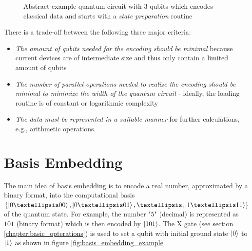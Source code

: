\begin{figure}[!h]
    \centering
    \caption{Abstract example quantum circuit with 3 qubits which encodes classical data and starts with a \textit{state preparation} routine}
    \label{fig:circuit_state_preparation}
\end{figure}

There is a trade-off between the following three major criteria\cite{Weigold2021_ExpandingDataEncodingPatterns}:
\begin{itemize}
    \item \textit{The amount of qubits needed for the encoding should be minimal} because current devices are of intermediate size and thus only contain a limited amount of qubits
    \item \textit{The number of parallel operations needed to realize the encoding should be minimal to minimize the width of the quantum circuit} - ideally, the loading routine is of constant or logarithmic complexity
    \item \textit{The data must be represented in a suitable manner} for further calculations, e.g., arithmetic operations.
\end{itemize}

\section{Basis Embedding}\label{section:basis_embedding}

The main idea of basis embedding is to encode a real number, approximated by a binary format, into the computational basis $\{\ket{0…00}, \ket{0…01}, …, \ket{1…11}\}$ of the quantum state. For example, the number "$5$" (decimal) is represented as $101$ (binary format) which is then encoded by $\ket{101}$\cite{Weigold2021_EncodingPatternsForQuantumAlgorithms,schuld2021supervised}. The $\mathrm{X}$ gate (see section \ref{chapter:basic_opterations}) is used to set a qubit with initial ground state $\ket{0}$ to $\ket{1}$ as shown in figure \ref{fig:basis_embedding_example}.

